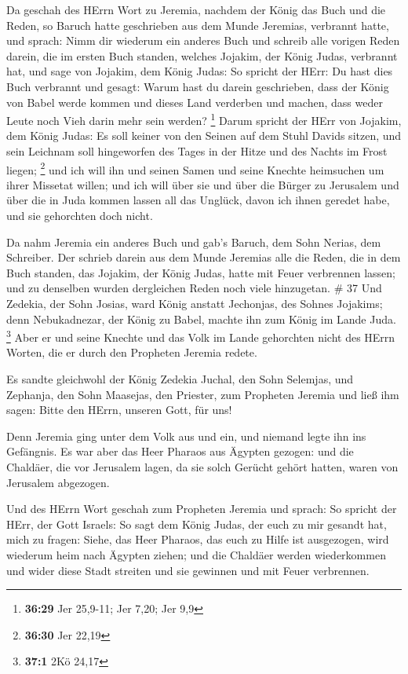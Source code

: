  Da geschah des HErrn Wort zu Jeremia, nachdem der König
das Buch und die Reden, so Baruch hatte geschrieben aus dem Munde
Jeremias, verbrannt hatte, und sprach:  Nimm dir wiederum
ein anderes Buch und schreib alle vorigen Reden darein, die im ersten
Buch standen, welches Jojakim, der König Judas, verbrannt hat,
 und sage von Jojakim, dem König Judas: So spricht der
HErr: Du hast dies Buch verbrannt und gesagt: Warum hast du darein
geschrieben, dass der König von Babel werde kommen und dieses Land
verderben und machen, dass weder Leute noch Vieh darin mehr sein werden?
\footnote{\textbf{36:29} Jer 25,9-11; Jer 7,20; Jer 9,9} 
Darum spricht der HErr von Jojakim, dem König Judas: Es soll keiner von
den Seinen auf dem Stuhl Davids sitzen, und sein Leichnam soll
hingeworfen des Tages in der Hitze und des Nachts im Frost liegen;
\footnote{\textbf{36:30} Jer 22,19}  und ich will ihn und
seinen Samen und seine Knechte heimsuchen um ihrer Missetat willen; und
ich will über sie und über die Bürger zu Jerusalem und über die in Juda
kommen lassen all das Unglück, davon ich ihnen geredet habe, und sie
gehorchten doch nicht.

 Da nahm Jeremia ein anderes Buch und gab's Baruch, dem
Sohn Nerias, dem Schreiber. Der schrieb darein aus dem Munde Jeremias
alle die Reden, die in dem Buch standen, das Jojakim, der König Judas,
hatte mit Feuer verbrennen lassen; und zu denselben wurden dergleichen
Reden noch viele hinzugetan. \# 37  Und Zedekia, der Sohn
Josias, ward König anstatt Jechonjas, des Sohnes Jojakims; denn
Nebukadnezar, der König zu Babel, machte ihn zum König im Lande Juda.
\footnote{\textbf{37:1} 2Kö 24,17}  Aber er und seine
Knechte und das Volk im Lande gehorchten nicht des HErrn Worten, die er
durch den Propheten Jeremia redete.

 Es sandte gleichwohl der König Zedekia Juchal, den Sohn
Selemjas, und Zephanja, den Sohn Maasejas, den Priester, zum Propheten
Jeremia und ließ ihm sagen: Bitte den HErrn, unseren Gott, für uns!

 Denn Jeremia ging unter dem Volk aus und ein, und niemand
legte ihn ins Gefängnis.  Es war aber das Heer Pharaos aus
Ägypten gezogen: und die Chaldäer, die vor Jerusalem lagen, da sie solch
Gerücht gehört hatten, waren von Jerusalem abgezogen.

 Und des HErrn Wort geschah zum Propheten Jeremia und
sprach:  So spricht der HErr, der Gott Israels: So sagt dem
König Judas, der euch zu mir gesandt hat, mich zu fragen: Siehe, das
Heer Pharaos, das euch zu Hilfe ist ausgezogen, wird wiederum heim nach
Ägypten ziehen;  und die Chaldäer werden wiederkommen und
wider diese Stadt streiten und sie gewinnen und mit Feuer verbrennen.

